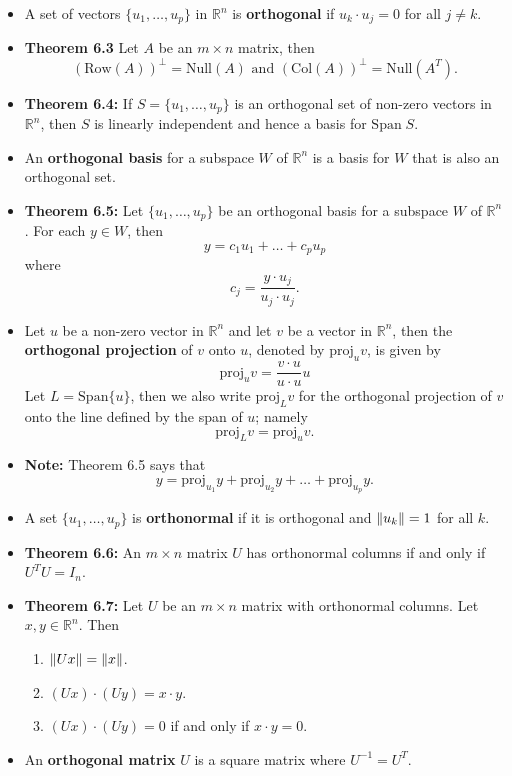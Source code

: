 \begin{itemize}
\item 	A set of vectors $\{ u_1, \dots, u_p\}$ in $\mathbb{R}^n$ is {\bf orthogonal} if $u_k \cdot u_j=0$ for all $j\neq k$.
\item {\bf Theorem 6.3} Let $A$ be an $m\times n$ matrix, then $$(\text{Row}(A))^{\perp} = \text{Null}(A) \text{ and } (\text{Col}(A))^{\perp}= \text{Null}(A^{T}).$$
\item
{\bf Theorem 6.4:} If $S=\{ u_1, \dots, u_p\}$ is an orthogonal set of non-zero vectors in $\mathbb{R}^n$, then $S$ is linearly independent and hence a basis for $\text{Span} \; S$.
\item An {\bf orthogonal basis} for a subspace $W$ of $\mathbb{R}^n$ is a basis for $W$ that is also an orthogonal set.
\item {\bf Theorem 6.5:} Let $\{u_1, \dots,u_p\}$ be an orthogonal basis for a subspace $W$ of $\mathbb{R}^n$. For each $y\in W$, then $$y=c_1 u_1+\dots+c_p u_p$$ where $$c_j=\frac{y\cdot u_j}{u_j \cdot u_j}.$$
\item Let $u$ be a non-zero vector in $\mathbb{R}^n$ and let $v$ be a vector in $\mathbb{R}^n$, then the {\bf orthogonal projection} of $v$ onto $u$, denoted by $\text{proj}_{u}{v}$, is given by $$\text{proj}_{u}{v}=\frac{v\cdot u}{u \cdot u} u$$ Let $L=\text{Span}\{ u\}$, then we also write $\text{proj}_{L}{v}$ for the orthogonal projection of $v$ onto the line defined by the span of $u$; namely $$\text{proj}_{L}{v}=\text{proj}_{u}{v}.$$
\item {\bf Note:} Theorem 6.5 says that $$y=\text{proj}_{u_1}{y}+\text{proj}_{u_2}{y}+\dots+ \text{proj}_{u_p}{y}.$$
\item A set $\{u_1, \dots, u_p\}$ is {\bf orthonormal} if it is orthogonal and $\left\lVert u_k\right\rVert=1$ for all $k$.
\item {\bf Theorem 6.6:} An $m\times n$ matrix $U$ has orthonormal columns if and only if $U^{T}U=I_n$.
\item {\bf Theorem 6.7:} Let $U$ be an $m\times n$ matrix with orthonormal columns. Let $x,y \in \mathbb{R}^n$. Then
\begin{enumerate}
\item $\left\lVert Ux\right\rVert=\left\lVert x\right\rVert$.
\item $(Ux)\cdot (Uy) = x \cdot y$.
\item $(Ux) \cdot (Uy)=0$ if and only if $x \cdot y=0$.
\end{enumerate}
\item An {\bf orthogonal matrix} $U$ is a square matrix where $U^{-1}=U^{T}$. 
\end{itemize}

